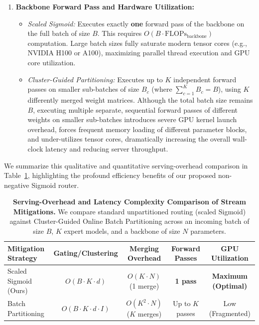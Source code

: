 \begin{enumerate}
    \item \textbf{Backbone Forward Pass and Hardware Utilization:}
    \begin{itemize}
        \item \emph{Scaled Sigmoid:} Executes exactly \textbf{one} forward pass of the backbone on
the full batch of size $B$. This requires $O(B \cdot \text{FLOPs}_{\text{backbone}})$ computation.
Large batch sizes fully saturate modern tensor cores (e.g., NVIDIA H100 or A100), maximizing
parallel thread execution and GPU core utilization.
        \item \emph{Cluster-Guided Partitioning:} Executes up to $K$ independent forward passes on
smaller sub-batches of size $B_c$ (where $\sum_{c=1}^K B_c = B$), using $K$ differently merged
weight matrices. Although the total batch size remains $B$, executing multiple separate, sequential
forward passes of different weights on smaller sub-batches introduces severe GPU kernel launch
overhead, forces frequent memory loading of different parameter blocks, and under-utilizes tensor
cores, dramatically increasing the overall wall-clock latency and reducing server throughput.
    \end{itemize}
\end{enumerate}

We summarize this qualitative and quantitative serving-overhead comparison in
Table~\ref{tab:serving_comparison}, highlighting the profound efficiency benefits of our proposed
non-negative Sigmoid router.

\begin{table}[t]
\caption{\textbf{Serving-Overhead and Latency Complexity Comparison of Stream Mitigations.} We compare standard unpartitioned routing (scaled Sigmoid) against Cluster-Guided Online Batch Partitioning across an incoming batch of size $B$, $K$ expert models, and a backbone of size $N$ parameters.}
\label{tab:serving_comparison}
\vskip 0.15in
\begin{center}
\begin{small}
\begin{sc}
\setlength{\tabcolsep}{5pt}
\begin{tabular}{lcccc}
\toprule
Mitigation Strategy & Gating/Clustering & Merging Overhead & Forward Passes & GPU Utilization \\
\midrule
Scaled Sigmoid (Ours) & $O(B \cdot K \cdot d)$ & \textbf{$O(K \cdot N)$} (1 merge) & \textbf{1
pass} & \textbf{Maximum (Optimal)} \\
Batch Partitioning & $O(B \cdot K \cdot d \cdot I)$ & $O(K^2 \cdot N)$ ($K$ merges) & Up to $K$
passes & Low (Fragmented) \\
\bottomrule
\end{tabular}
\end{sc}
\end{small}
\end{center}
\vskip -0.1in
\end{table}

